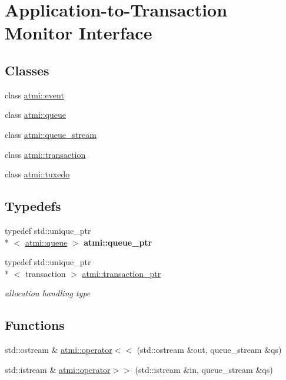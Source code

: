 \hypertarget{group__atmi}{\section{Application-\/to-\/\+Transaction Monitor Interface}
\label{group__atmi}
}
\subsection*{Classes}
\begin{DoxyCompactItemize}
\item 
class \hyperlink{classatmi_1_1event}{atmi\+::event}
\item 
class \hyperlink{classatmi_1_1queue}{atmi\+::queue}
\item 
class \hyperlink{classatmi_1_1queue__stream}{atmi\+::queue\+\_\+stream}
\item 
class \hyperlink{classatmi_1_1transaction}{atmi\+::transaction}
\item 
class \hyperlink{classatmi_1_1tuxedo}{atmi\+::tuxedo}
\end{DoxyCompactItemize}
\subsection*{Typedefs}
\begin{DoxyCompactItemize}
\item 
\hypertarget{group__atmi_ga7cfd5961e0e05b148f12be311177a1a8}{typedef std\+::unique\+\_\+ptr\\*
$<$ \hyperlink{classatmi_1_1queue}{atmi\+::queue} $>$ {\bfseries atmi\+::queue\+\_\+ptr}}\label{group__atmi_ga7cfd5961e0e05b148f12be311177a1a8}

\item 
\hypertarget{group__atmi_gab8e359f2305eaf285b0b0745d3b41997}{typedef std\+::unique\+\_\+ptr\\*
$<$ transaction $>$ \hyperlink{group__atmi_gab8e359f2305eaf285b0b0745d3b41997}{atmi\+::transaction\+\_\+ptr}}\label{group__atmi_gab8e359f2305eaf285b0b0745d3b41997}

\begin{DoxyCompactList}\small\item\em allocation handling type \end{DoxyCompactList}\end{DoxyCompactItemize}
\subsection*{Functions}
\begin{DoxyCompactItemize}
\item 
std\+::ostream \& \hyperlink{group__atmi_gaf05328bfccb410191dc529104dc3a04f}{atmi\+::operator$<$$<$} (std\+::ostream \&out, queue\+\_\+stream \&qs)
\item 
std\+::istream \& \hyperlink{group__atmi_ga0be52e17b198d28a9436b17b59efcca6}{atmi\+::operator$>$$>$} (std\+::istream \&in, queue\+\_\+stream \&qs)
\end{DoxyCompactItemize}


